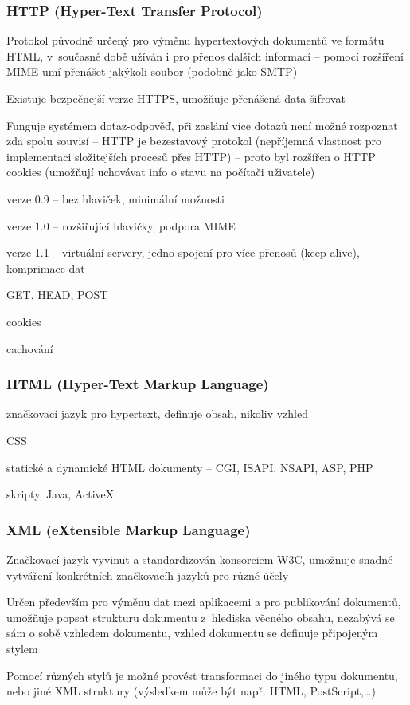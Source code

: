 \subsubsection*{HTTP (Hyper-Text Transfer Protocol)}
\begin{pitemize}
	\item Protokol původně určený pro výměnu hypertextových dokumentů ve formátu HTML, v současné době užíván i pro přenos dalších informací – pomocí rozšíření MIME umí přenášet jakýkoli soubor (podobně jako SMTP)
	\item Existuje bezpečnejší verze HTTPS, umožňuje přenášená data šifrovat
	\item Funguje systémem dotaz-odpověď, při zaslání více dotazů není možné rozpoznat zda spolu souvisí -- HTTP je bezestavový protokol (nepříjemná vlastnost pro implementaci složitejších procesů přes HTTP) – proto byl rozšířen o HTTP cookies (umožňují uchovávat info o stavu na počítači uživatele)
	\item verze 0.9 -- bez hlaviček, minimální možnosti
	\item verze 1.0 -- rozšiřující hlavičky, podpora MIME
	\item verze 1.1 -- virtuální servery, jedno spojení pro více přenosů (keep-alive), komprimace dat
	\item GET, HEAD, POST
	\item cookies
	\item cachování 
\end{pitemize}

\subsubsection*{HTML (Hyper-Text Markup Language)}
\begin{pitemize}
	\item značkovací jazyk pro hypertext, definuje obsah, nikoliv vzhled
	\item CSS
	\item statické a dynamické HTML dokumenty -- CGI, ISAPI, NSAPI, ASP, PHP
	\item skripty, Java, ActiveX 
\end{pitemize}

\subsubsection*{XML (eXtensible Markup Language)}
\begin{pitemize}
	\item Značkovací jazyk vyvinut a standardizován konsorciem W3C, umožnuje snadné vytváření konkrétních značkovacíh jazyků pro různé účely
	\item Určen především pro výměnu dat mezi aplikacemi a pro publikování dokumentů, umožňuje popsat strukturu dokumentu z hlediska věcného obsahu, nezabývá se sám o sobě vzhledem dokumentu, vzhled dokumentu se definuje připojeným stylem
	\item Pomocí různých stylů je možné provést transformaci do jiného typu dokumentu, nebo jiné XML struktury (výsledkem může být např. HTML, PostScript,\dots)
\end{pitemize}

